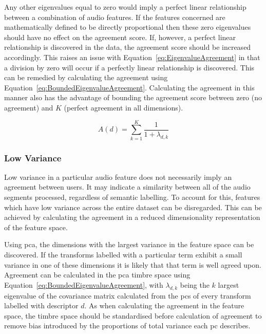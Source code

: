			Any other eigenvalues equal to zero would imply a perfect linear relationship between a combination
			of audio features. If the features concerned are mathematically defined to be directly proportional
			then these zero eigenvalues should have no effect on the agreement score. If, however, a perfect
			linear relationship is discovered in the data, the agreement score should be increased
			accordingly. This raises an issue with Equation~\ref{eq:EigenvalueAgreement} in that a division by
			zero will occur if a perfectly linear relationship is discovered. This can be remedied by
			calculating the agreement using Equation~\ref{eq:BoundedEigenvalueAgreement}. Calculating the
			agreement in this manner also has the advantage of bounding the agreement score between zero (no
			agreement) and $K$ (perfect agreement in all dimensions).

			\begin{equation}
				A(d) = \sum_{k = 1}^{K} \frac{1}{1 + \lambda_{d,k}}
				\label{eq:BoundedEigenvalueAgreement}
			\end{equation}

		\subsubsection*{Low Variance}
			Low variance in a particular audio feature does not necessarily imply an agreement between users.
			It may indicate a similarity between all of the audio segments processed, regardless of semantic
			labelling. To account for this, features which have low variance across the entire dataset can be
			disregarded. This can be achieved by calculating the agreement in a reduced dimensionality
			representation of the feature space.

			Using \acrshort{pca}, the dimensions with the largest variance in the feature space can be
			discovered. If the transforms labelled with a particular term exhibit a small variance in one of
			these dimensions it is likely that that term is well agreed upon. Agreement can be calculated in
			the \acrshort{pca} timbre space using Equation~\ref{eq:BoundedEigenvalueAgreement}, with
			$\lambda_{d,k}$ being the $k$ largest eigenvalue of the covariance matrix calculated from
			the \acrshort{pc}s of every transform labelled with descriptor $d$. As when calculating the
			agreement in the feature space, the timbre space should be standardised before calculation of
			agreement to remove bias introduced by the proportions of total variance each \acrshort{pc}
			describes.

